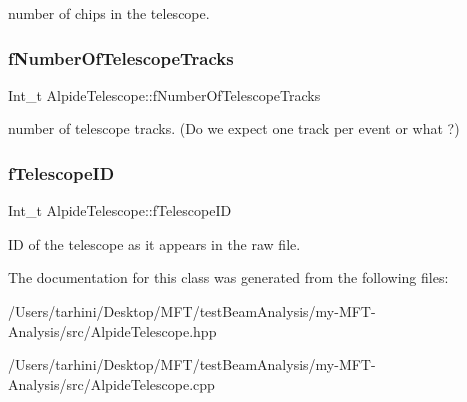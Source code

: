 number of chips in the telescope. \mbox{\label{class_alpide_telescope_a5767a235a504a73169601284b7f2f55c}} 
\subsubsection{\texorpdfstring{f\+Number\+Of\+Telescope\+Tracks}{fNumberOfTelescopeTracks}}
{\footnotesize\ttfamily Int\+\_\+t Alpide\+Telescope\+::f\+Number\+Of\+Telescope\+Tracks\hspace{0.3cm}{\ttfamily [private]}}

number of telescope tracks. (Do we expect one track per event or what ?) \mbox{\label{class_alpide_telescope_a9b885e9e99ae303294ba02f3bacd049b}} 
\subsubsection{\texorpdfstring{f\+Telescope\+ID}{fTelescopeID}}
{\footnotesize\ttfamily Int\+\_\+t Alpide\+Telescope\+::f\+Telescope\+ID\hspace{0.3cm}{\ttfamily [private]}}

ID of the telescope as it appears in the raw file. 

The documentation for this class was generated from the following files\+:\begin{DoxyCompactItemize}
\item 
/\+Users/tarhini/\+Desktop/\+M\+F\+T/test\+Beam\+Analysis/my-\/\+M\+F\+T-\/\+Analysis/src/Alpide\+Telescope.\+hpp\item 
/\+Users/tarhini/\+Desktop/\+M\+F\+T/test\+Beam\+Analysis/my-\/\+M\+F\+T-\/\+Analysis/src/Alpide\+Telescope.\+cpp\end{DoxyCompactItemize}
